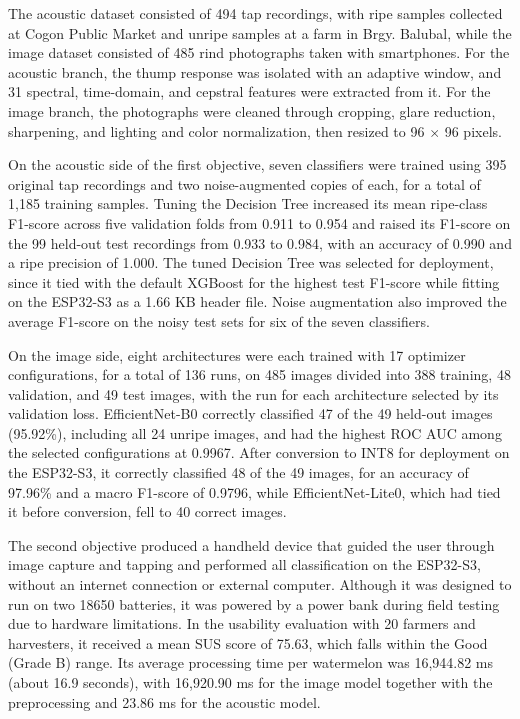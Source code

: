 \begin{thesisprose}
The acoustic dataset consisted of 494 tap recordings, with ripe samples collected at Cogon Public Market and unripe samples at a farm in Brgy. Balubal, while the image dataset consisted of 485 rind photographs taken with smartphones. For the acoustic branch, the thump response was isolated with an adaptive window, and 31 spectral, time-domain, and cepstral features were extracted from it. For the image branch, the photographs were cleaned through cropping, glare reduction, sharpening, and lighting and color normalization, then resized to 96 \ensuremath{\times} 96 pixels.

On the acoustic side of the first objective, seven classifiers were trained using 395 original tap recordings and two noise-augmented copies of each, for a total of 1,185 training samples. Tuning the Decision Tree increased its mean ripe-class F1-score across five validation folds from 0.911 to 0.954 and raised its F1-score on the 99 held-out test recordings from 0.933 to 0.984, with an accuracy of 0.990 and a ripe precision of 1.000. The tuned Decision Tree was selected for deployment, since it tied with the default XGBoost for the highest test F1-score while fitting on the ESP32-S3 as a 1.66 KB header file. Noise augmentation also improved the average F1-score on the noisy test sets for six of the seven classifiers.

On the image side, eight architectures were each trained with 17 optimizer configurations, for a total of 136 runs, on 485 images divided into 388 training, 48 validation, and 49 test images, with the run for each architecture selected by its validation loss. EfficientNet-B0 correctly classified 47 of the 49 held-out images (95.92\%), including all 24 unripe images, and had the highest ROC AUC among the selected configurations at 0.9967. After conversion to INT8 for deployment on the ESP32-S3, it correctly classified 48 of the 49 images, for an accuracy of 97.96\% and a macro F1-score of 0.9796, while EfficientNet-Lite0, which had tied it before conversion, fell to 40 correct images.

The second objective produced a handheld device that guided the user through image capture and tapping and performed all classification on the ESP32-S3, without an internet connection or external computer. Although it was designed to run on two 18650 batteries, it was powered by a power bank during field testing due to hardware limitations. In the usability evaluation with 20 farmers and harvesters, it received a mean SUS score of 75.63, which falls within the Good (Grade B) range. Its average processing time per watermelon was 16,944.82 ms (about 16.9 seconds), with 16,920.90 ms for the image model together with the preprocessing and 23.86 ms for the acoustic model.


\end{thesisprose}
